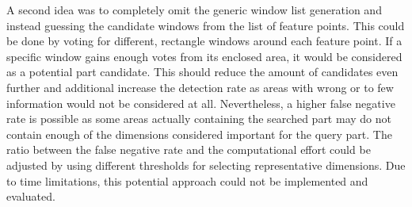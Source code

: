 A second idea was to completely omit the generic window list generation and instead guessing the candidate windows from the list of feature points. This could be done by voting for different, rectangle windows around each feature point. If a specific window gains enough votes from its enclosed area, it would be considered as a potential part candidate. This should reduce the amount of candidates even further and additional increase the detection rate as areas with wrong or to few information would not be considered at all. Nevertheless, a higher false negative rate is possible as some areas actually containing the searched part may do not contain enough of the dimensions considered important for the query part. The ratio between the false negative rate and the computational effort could be adjusted by using different thresholds for selecting representative dimensions. Due to time limitations, this potential approach could not be implemented and evaluated.